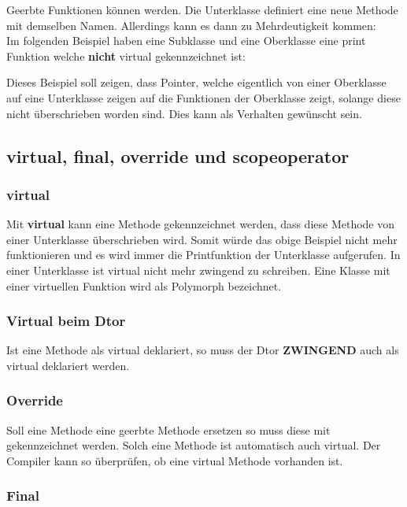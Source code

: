 Geerbte Funktionen können  werden. 
Die Unterklasse definiert eine neue Methode mit demselben Namen.
Allerdings kann es dann zu Mehrdeutigkeit kommen:\\
Im folgenden Beispiel haben eine Subklasse und eine Oberklasse eine print Funktion welche \textbf{nicht} virtual gekennzeichnet ist:



Dieses Beispiel soll zeigen, dass Pointer, welche eigentlich von einer Oberklasse auf eine Unterklasse zeigen auf die  Funktionen der Oberklasse zeigt, solange diese nicht überschrieben worden sind.
Dies kann als Verhalten gewünscht sein. 

\subsection{virtual, final, override und scopeoperator}

\subsubsection{virtual}\label{Virtual}

Mit \textbf{virtual} kann eine Methode gekennzeichnet werden, dass diese Methode von einer Unterklasse überschrieben wird.
Somit würde das obige Beispiel nicht mehr funktionieren und es wird immer die Printfunktion der Unterklasse aufgerufen. 
In einer Unterklasse ist virtual nicht mehr zwingend zu schreiben.
Eine Klasse mit einer virtuellen Funktion wird als Polymorph bezeichnet.

\subsubsection{Virtual beim Dtor}

Ist eine Methode als virtual deklariert, so muss der Dtor \textbf{ZWINGEND} auch als virtual deklariert werden.

\subsubsection{Override}

Soll eine Methode eine geerbte Methode ersetzen so muss diese mit  gekennzeichnet werden. 
Solch eine Methode ist automatisch auch virtual.
Der Compiler kann so überprüfen, ob eine virtual Methode vorhanden ist.

\subsubsection{Final}

